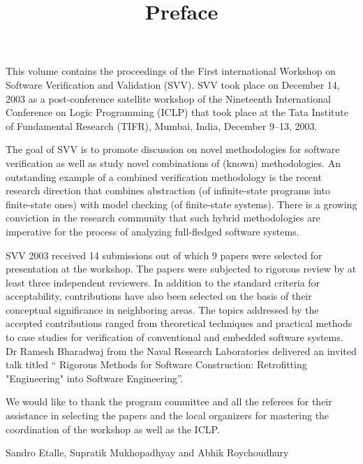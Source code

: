 \documentclass{entcs}
\begin{document}
\begin{frontmatter}
  \title{Preface}
\end{frontmatter}

This volume contains the proceedings of the First international Workshop
on Software Verification and Validation (SVV). SVV took place  on
December 14, 2003 as a post-conference satellite workshop of the
Nineteenth International Conference on Logic Programming (ICLP) that
took place at the Tata Institute of Fundamental Research (TIFR), Mumbai,
India, December 9--13, 2003.

The goal of SVV is to promote discussion on novel methodologies for
software verification as well as study novel combinations of (known)
methodologies. An outstanding example of a combined verification
methodology is the recent research direction that combines abstraction
(of infinite-state programs into finite-state ones) with model checking
(of finite-state systems). There is a growing conviction in the research
community that such hybrid methodologies are imperative for the process
of analyzing full-fledged software systems.

SVV 2003 received 14 submissions out of which 9 papers were selected for
presentation at the workshop. The papers were subjected to rigorous
review by at least three independent reviewers. In addition to the
standard criteria for acceptability, contributions have also been
selected on the basis of their conceptual significance in neighboring
areas. The topics addressed by the accepted contributions ranged from
theoretical techniques and practical methods to case studies for
verification of conventional and embedded software systems.
Dr Ramesh Bharadwaj from the Naval Research Laboratories delivered an
invited talk titled `` Rigorous Methods for Software Construction:
Retrofitting "Engineering" into Software Engineering''.

We would like to thank the program committee and all the referees for
their assistance in selecting the papers and the local organizers for
mastering the coordination of the workshop as well as the ICLP.

\vspace{5pt}
Sandro Etalle, Supratik Mukhopadhyay and Abhik Roychoudhury
\end{document}
